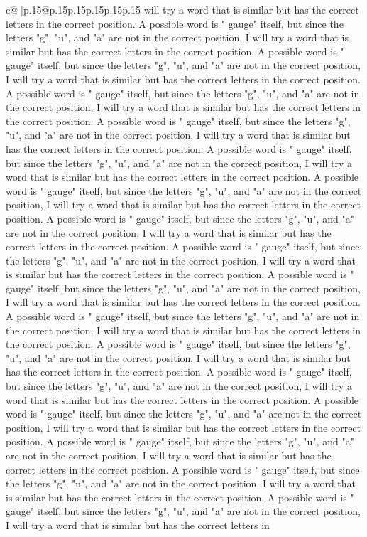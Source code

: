 \documentclass{article}
\begin{document}
{\begin{supertabular}{c@{$\;$}|p{.15\linewidth}@{}p{.15\linewidth}p{.15\linewidth}p{.15\linewidth}p{.15\linewidth}p{.15\linewidth}}
{{{will try a word that is similar but has the correct letters in the correct position. A possible word is " gauge" itself, but since the letters "g", "u", and "a" are not in the correct position, I will try a word that is similar but has the correct letters in the correct position. A possible word is " gauge" itself, but since the letters "g", "u", and "a" are not in the correct position, I will try a word that is similar but has the correct letters in the correct position. A possible word is " gauge" itself, but since the letters "g", "u", and "a" are not in the correct position, I will try a word that is similar but has the correct letters in the correct position. A possible word is " gauge" itself, but since the letters "g", "u", and "a" are not in the correct position, I will try a word that is similar but has the correct letters in the correct position. A possible word is " gauge" itself, but since the letters "g", "u", and "a" are not in the correct position, I will try a word that is similar but has the correct letters in the correct position. A possible word is " gauge" itself, but since the letters "g", "u", and "a" are not in the correct position, I will try a word that is similar but has the correct letters in the correct position. A possible word is " gauge" itself, but since the letters "g", "u", and "a" are not in the correct position, I will try a word that is similar but has the correct letters in the correct position. A possible word is " gauge" itself, but since the letters "g", "u", and "a" are not in the correct position, I will try a word that is similar but has the correct letters in the correct position. A possible word is " gauge" itself, but since the letters "g", "u", and "a" are not in the correct position, I will try a word that is similar but has the correct letters in the correct position. A possible word is " gauge" itself, but since the letters "g", "u", and "a" are not in the correct position, I will try a word that is similar but has the correct letters in the correct position. A possible word is " gauge" itself, but since the letters "g", "u", and "a" are not in the correct position, I will try a word that is similar but has the correct letters in the correct position. A possible word is " gauge" itself, but since the letters "g", "u", and "a" are not in the correct position, I will try a word that is similar but has the correct letters in the correct position. A possible word is " gauge" itself, but since the letters "g", "u", and "a" are not in the correct position, I will try a word that is similar but has the correct letters in the correct position. A possible word is " gauge" itself, but since the letters "g", "u", and "a" are not in the correct position, I will try a word that is similar but has the correct letters in the correct position. A possible word is " gauge" itself, but since the letters "g", "u", and "a" are not in the correct position, I will try a word that is similar but has the correct letters in the correct position. A possible word is " gauge" itself, but since the letters "g", "u", and "a" are not in the correct position, I will try a word that is similar but has the correct letters in }}}
\end{supertabular}}
\end{document}
